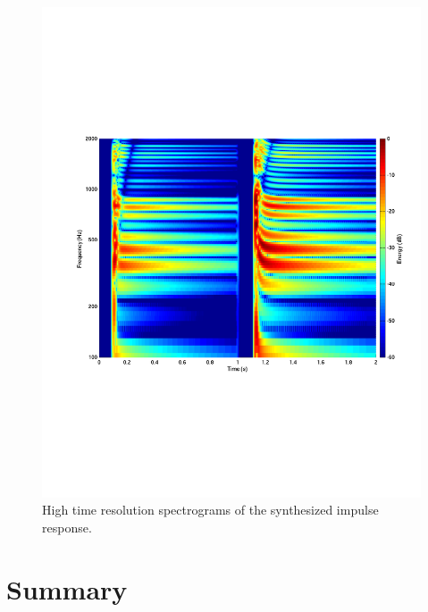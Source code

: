 \documentclass{aes137}
\begin{document}
\begin{figure}[h!] \centering \includegraphics[width=\linewidth]{images/IM_480c00_sgm_cropped.pdf} \caption{High time resolution spectrograms of the synthesized impulse response.} \end{figure}



\section{Summary}
\end{document}

